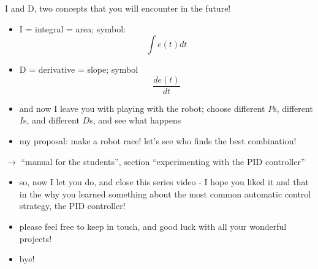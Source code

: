 \begin{frame}{I and D, two concepts that you will encounter in the future!}
	\begin{itemize}
		\item I = integral = area; symbol:
			$$
				\int e(t) dt
			$$
		\item D = derivative = slope; symbol
			$$
				\frac{d e(t)}{d t}
			$$
	\end{itemize}
\end{frame}


\begin{frame}
	\begin{itemize}
		\item and now I leave you with playing with the robot; choose different $P$s, different $I$s, and different $D$s, and see what happens
		\item my proposal: make a robot race! let's see who finds the best combination!
	\end{itemize}
\end{frame}


\begin{frame}
	\begin{center}
		$\rightarrow$ ``manual for the students'', section ``experimenting with the PID controller''
	\end{center}
\end{frame}


\begin{frame}
	\begin{itemize}
		\item so, now I let you do, and close this series video - I hope you liked it and that in the why you learned something about the most common automatic control strategy, the PID controller!
		\item please feel free to keep in touch, and good luck with all your wonderful projects!
		\item bye!
	\end{itemize}
\end{frame}


